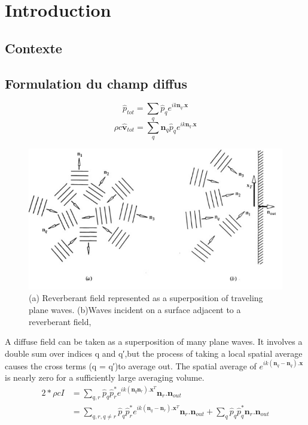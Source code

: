 \documentclass[
a4paper, %
12pt, %
]{SourcesTemplate/TemplateReport}
\begin{document}


\tableofcontents %


\chapter{Introduction}

\section{Contexte}

\section{Formulation du champ diffus}
\begin{equation}
	\hat{p}_{tot} = \sum_{q}	\hat{p}_q e^{ik\mathbf{n}_q.\mathbf{x}}
\end{equation}
\begin{equation}
	\rho c \mathbf{\hat{v}}_{tot} = \sum_{q} \mathbf{n}_q \hat{p}_q e^{ik\mathbf{n}_q.\mathbf{x}}
\end{equation}
\begin{figure}
	\centering
	\includegraphics[width=0.7\linewidth]{images/planew}
	\caption{(a) Reverberant field represented as a superposition of traveling plane waves. (b)Waves incident on a surface adjacent to a reverberant field, \cite{pierce_acoustics_2019}}
	\label{fig:planew}
\end{figure}

A diffuse field can be taken as a superposition of many plane waves. It involves a double sum over indices q and q′,but the process of taking a local spatial average causes the cross terms (q = q′)to average out. The spatial average of $e^{ik(\mathbf{n}_q-\mathbf{n}_q ) . \mathbf{x}}$ is nearly zero for a sufficiently large averaging volume.
\begin{equation}
\begin{split}
	 2* \rho c I & =\sum_{q, r}  \hat{p}_q  \hat{p}_r^* e^{ik(\mathbf{n}_q\mathbf{n}_r).\mathbf{x}^T} \mathbf{n}_r.\mathbf{n}_{out}\\
	& = \sum_{q, r, q\neq r}  \hat{p}_q  \hat{p}_r^* e^{ik(\mathbf{n}_q-\mathbf{n}_r).\mathbf{x}^T} \mathbf{n}_r.\mathbf{n}_{out} + \sum_{q}  \hat{p}_q  \hat{p}_q^*  \mathbf{n}_r.\mathbf{n}_{out}\\
	\end{split}
\end{equation}
\end{document}
